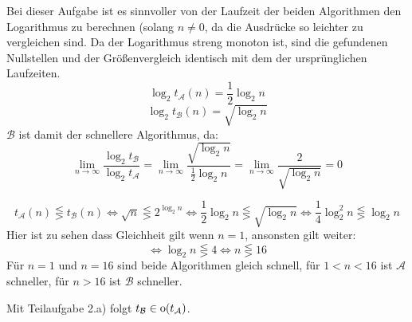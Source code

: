 \begin{flushenum}
\item 
	\begin{flushalpha}
	\item
		Bei dieser Aufgabe ist es sinnvoller von der Laufzeit der beiden Algorithmen den Logarithmus zu berechnen (solang $n \neq 0$,
		da die Ausdrücke so leichter zu vergleichen sind. Da der Logarithmus streng monoton ist,
		sind die gefundenen Nullstellen und der Größenvergleich identisch mit dem der ursprünglichen Laufzeiten.
		\[ \log_2 t_\mathcal{A}(n) = \frac{1}{2} \log_2 n \]
		\[ \log_2 t_\mathcal{B}(n) = \sqrt{\log_2 n} \]
		$\mathcal{B}$ ist damit der schnellere Algorithmus, da:
		\[ \lim_{n \rightarrow \infty} \frac{\log_2 t_\mathcal{B}}{\log_2 t_\mathcal{A}} = 
		   \lim_{n \rightarrow \infty} \frac{\sqrt{\log_2 n}}{\frac{1}{2} \log_2 n} =
		   \lim_{n \rightarrow \infty} \frac{2}{\sqrt{\log_2 n}} = 0 \]
	\item
		\[ t_\mathcal{A}(n) \lesseqgtr t_\mathcal{B}(n) \Leftrightarrow \sqrt{n} \lesseqgtr 2^{\log_2 n} 
		   \Leftrightarrow \frac{1}{2} \log_2 n \lesseqgtr \sqrt{\log_2 n} \Leftrightarrow \frac{1}{4} \log_2^2 n\lesseqgtr \log_2 n \]
		Hier ist zu sehen dass Gleichheit gilt wenn $n = 1$, ansonsten gilt weiter:
		\[ \Leftrightarrow \log_2 n \lesseqgtr 4 \Leftrightarrow n \lesseqgtr 16 \]
		Für $n=1$ und $n=16$ sind beide Algorithmen gleich schnell, für $1 < n < 16$ ist $\mathcal{A}$ schneller,
		für $n > 16$ ist $\mathcal{B}$ schneller.
	
	\item
		Mit Teilaufgabe 2.a) folgt $t_\mathcal{B} \in \hbox{o}(t_\mathcal{A})$.
	\end{flushalpha}
\end{flushenum}
